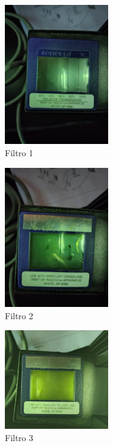 \documentclass[a4paper]{article}
\begin{document}
        \begin{figure}[h]
          \centering
          \includegraphics[trim={0 30cm 0 30cm},clip,width=4.5cm]{../imagenes/filtro1.jpg}
          \caption{\small Filtro 1}
        \end{figure}

        \begin{figure}[h]       
          \centering
            \includegraphics[trim={0 30cm 0 30cm},clip,width=4.5cm]{../imagenes/filtro2.jpg}
            \caption{\small Filtro 2}
        \end{figure}
          
        \begin{figure}[h]
                \centering
                \includegraphics[width=4.5cm]{../imagenes/filtro3.jpg}
                \caption{\small Filtro 3}
        \end{figure}
        \vspace{5mm}
        
\end{document}
